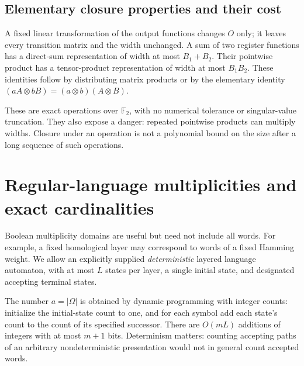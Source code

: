\documentclass[11pt,letterpaper]{article}
\newcommand{\F}{{\mathbb F_2}}
\theoremstyle{definition}
\theoremstyle{remark}
\numberwithin{equation}{section}
\begin{document}
\subsection{Elementary closure properties and their cost}
A fixed linear transformation of the output functions changes $O$ only;
it leaves every transition matrix and the width unchanged. A sum of two
register functions has a direct-sum representation of width at most
$B_1+B_2$. Their pointwise product has a tensor-product representation of
width at most $B_1B_2$. These identities follow by distributing matrix
products or by the elementary identity
$(aA\otimes bB)=(a\otimes b)(A\otimes B)$.

These are exact operations over $\F$, with no numerical tolerance or
singular-value truncation. They also expose a danger: repeated pointwise
products can multiply widths. Closure under an operation is not a
polynomial bound on the size after a long sequence of such operations.

\section{Regular-language multiplicities and exact cardinalities}
\label{sec:language}

Boolean multiplicity domains are useful but need not include all words.
For example, a fixed homological layer may correspond to words of a fixed
Hamming weight. We allow an explicitly supplied \emph{deterministic} layered
language automaton, with at most $L$ states per layer, a single initial
state, and designated accepting terminal states.

The number $a=|\Omega|$ is obtained by dynamic programming with integer
counts: initialize the initial-state count to one, and for each symbol
add each state's count to the count of its specified successor. There
are $O(mL)$ additions of integers with at most $m+1$ bits. Determinism
matters: counting accepting paths of an arbitrary nondeterministic
presentation would not in general count accepted words.
\end{document}
